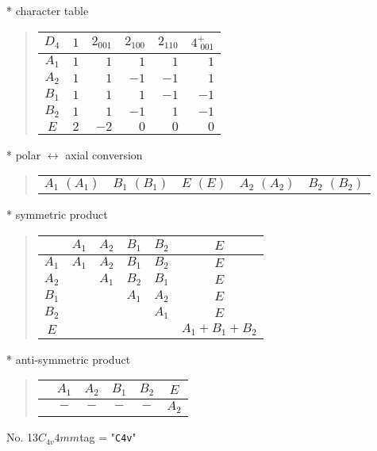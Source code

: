 \documentclass[fleqn,10pt,landscape]{jsarticle}
\begin{document}
* character table
\begin{quote}
\begin{tabular}{crrrrr} \hline \hline
$ D_{4} $ & $ 1 $ & $ 2{}_{001} $ & $ 2{}_{100} $ & $ 2{}_{110} $ & $ 4^{+}_{\,\,001} $ \\ \hline
$ A_{1} $ & $ 1 $ & $ 1 $ & $ 1 $ & $ 1 $ & $ 1 $ \\
$ A_{2} $ & $ 1 $ & $ 1 $ & $ -1 $ & $ -1 $ & $ 1 $ \\
$ B_{1} $ & $ 1 $ & $ 1 $ & $ 1 $ & $ -1 $ & $ -1 $ \\
$ B_{2} $ & $ 1 $ & $ 1 $ & $ -1 $ & $ 1 $ & $ -1 $ \\
$ E $ & $ 2 $ & $ -2 $ & $ 0 $ & $ 0 $ & $ 0 $ \\
 \hline \hline
\end{tabular}
\end{quote}
* polar $\leftrightarrow$ axial conversion
\begin{quote}
\begin{tabular}{ccccc}
$ A_{1}\,\,(A_{1}) $ & $ B_{1}\,\,(B_{1}) $ & $ E\,\,(E) $ & $ A_{2}\,\,(A_{2}) $ & $ B_{2}\,\,(B_{2}) $
\end{tabular}
\end{quote}
* symmetric product
\begin{quote}
\begin{tabular}{c|ccccc} \hline \hline
 & $ A_{1} $ & $ A_{2} $ & $ B_{1} $ & $ B_{2} $ & $ E $ \\ \hline
$ A_{1} $ & $ A_{1} $ & $ A_{2} $ & $ B_{1} $ & $ B_{2} $ & $ E $ \\
$ A_{2} $ & $  $ & $ A_{1} $ & $ B_{2} $ & $ B_{1} $ & $ E $ \\
$ B_{1} $ & $  $ & $  $ & $ A_{1} $ & $ A_{2} $ & $ E $ \\
$ B_{2} $ & $  $ & $  $ & $  $ & $ A_{1} $ & $ E $ \\
$ E $ & $  $ & $  $ & $  $ & $  $ & $ A_{1} + B_{1} + B_{2} $ \\
 \hline \hline
\end{tabular}
\end{quote}
* anti-symmetric product
\begin{quote}
\begin{tabular}{cccccc} \hline \hline
 & $ A_{1} $ & $ A_{2} $ & $ B_{1} $ & $ B_{2} $ & $ E $ \\ \hline
$  $ & $ - $ & $ - $ & $ - $ & $ - $ & $ A_{2} $ \\
 \hline \hline
\end{tabular}
\end{quote}
\newpage
No. 13\quad$C_{4v}$\quad$4mm$\quad[ tetragonal ]
tag = "{\tt C4v}"
\end{document}
